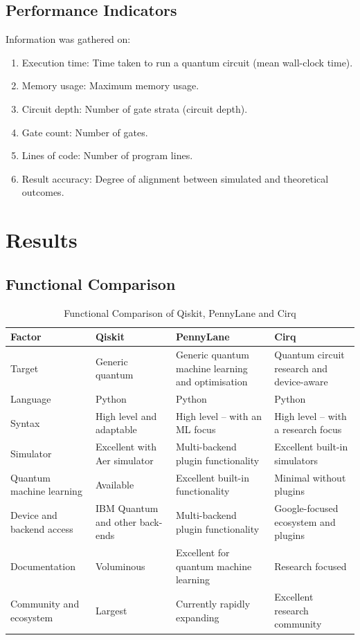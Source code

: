\documentclass[journal]{IEEEtran}
\begin{document}
\subsection{Performance Indicators}
Information was gathered on:
\begin{enumerate}
\item Execution time: Time taken to run a quantum circuit (mean wall-clock time).
\item Memory usage: Maximum memory usage.
\item Circuit depth: Number of gate strata (circuit depth).
\item Gate count: Number of gates.
\item Lines of code: Number of program lines.
\item Result accuracy: Degree of alignment between simulated and theoretical outcomes.
\end{enumerate}

\section{Results}

\subsection{Functional Comparison}
\begin{table}[!t]
\caption{Functional Comparison of Qiskit, PennyLane and Cirq}
\label{tab:functional}
\centering
\small
\begin{tabularx}{\textwidth}{l Y Y Y}
\toprule
\textbf{Factor} & \textbf{Qiskit} & \textbf{PennyLane} & \textbf{Cirq}\\
\midrule
Target & Generic quantum & Generic quantum machine learning and optimisation & Quantum circuit research and device-aware\\
Language & Python & Python & Python\\
Syntax & High level and adaptable & High level -- with an ML focus & High level -- with a research focus\\
Simulator & Excellent with Aer simulator & Multi-backend plugin functionality & Excellent built-in simulators\\
Quantum machine learning & Available & Excellent built-in functionality & Minimal without plugins\\
Device and backend access & IBM Quantum and other back-ends & Multi-backend plugin functionality & Google-focused ecosystem and plugins\\
Documentation & Voluminous & Excellent for quantum machine learning & Research focused\\
Community and ecosystem & Largest & Currently rapidly expanding & Excellent research community\\
\bottomrule
\end{tabularx}
\end{table}
\end{document}
